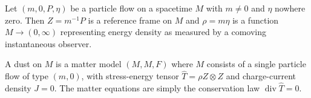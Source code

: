 Let $(m, 0, P, \eta)$ be a particle flow on a spacetime $M$ with $m \neq 0$ and $\eta$ nowhere zero. Then $Z = m^{-1} P$ is a reference frame on $M$ and $\rho = m \eta$ is a function $M \rightarrow (0, \infty)$ representing energy density as measured by a comoving instantaneous observer.

A dust on $M$ is a matter model $(M, M, F)$ where $M$ consists of a single particle flow of type $(m, 0)$, with stress-energy tensor $\hat{T} = \rho Z \otimes Z$ and charge-current density $J = 0$. The matter equations are simply the conservation law $\operatorname{div} \hat{T} = 0$.
